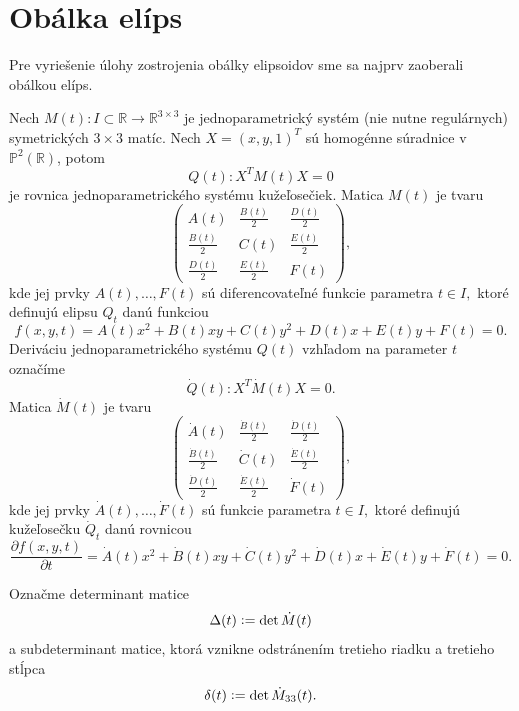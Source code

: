\section{Obálka elíps}
Pre vyriešenie úlohy zostrojenia obálky elipsoidov sme sa najprv zaoberali obálkou elíps.

Nech $M(t) \colon I \subset \mathbb{R} \rightarrow \mathbb{R}^{3 \times 3}$ je jednoparametrický systém (nie nutne regulárnych) symetrických $3 \times 3$ matíc. Nech $ X = (x, y, 1)^T$ sú homogénne súradnice v $\mathbb{P}^2(\mathbb{R})$, potom
\begin{equation*}
Q(t) \colon X^T M(t) X = 0 
\end{equation*}
je rovnica jednoparametrického systému kužeľosečiek. 
Matica $M(t)$ je tvaru
$$
\left(\begin{matrix} 
A(t) & \frac{B(t)}{2} & \frac{D(t)}{2} \\
\frac{B(t)}{2} & C(t) & \frac{E(t)}{2} \\
\frac{D(t)}{2} & \frac{E(t)}{2} & F(t) 
\end{matrix} \right),
$$
kde jej prvky $A(t), \dots, F(t)$ sú diferencovateľné funkcie parametra $t \in I,$ ktoré definujú elipsu $Q_t$ danú funkciou 
$$f(x, y, t) = A(t)x^2 + B(t)xy + C(t)y^2 + D(t)x + E(t)y + F(t) = 0.$$
Deriváciu jednoparametrického systému $Q(t)$ vzhľadom na parameter $t$ označíme
\begin{equation*}
\dot{Q}(t) \colon X^T \dot{M}(t) X = 0.
\end{equation*}
Matica $\dot{M}(t)$ je tvaru
$$
\left(\begin{matrix} 
\dot{A}(t) & \frac{\dot{B}(t)}{2} & \frac{\dot{D}(t)}{2} \\
\frac{\dot{B}(t)}{2} & \dot{C}(t) & \frac{\dot{E}(t)}{2} \\
\frac{\dot{D}(t)}{2} & \frac{\dot{E}(t)}{2} & \dot{F}(t) 
\end{matrix} \right),
$$
kde jej prvky $\dot{A}(t), \dots, \dot{F}(t)$ sú funkcie parametra $t \in I,$ ktoré definujú kužeľosečku $\dot{Q}_t$ danú rovnicou 
$$\dfrac{\partial f(x, y, t)}{\partial t} = \dot{A}(t)x^2 + \dot{B}(t)xy + \dot{C}(t)y^2 + \dot{D}(t)x + \dot{E}(t)y + \dot{F}(t) = 0.$$

Označme determinant matice 
$$\Delta(t) \vcentcolon = \det \dot{M}(t) $$
a subdeterminant matice, ktorá vznikne odstránením tretieho riadku a tretieho stĺpca 
$$\delta(t) \vcentcolon = \det \dot{M}_{33}(t).$$ 

